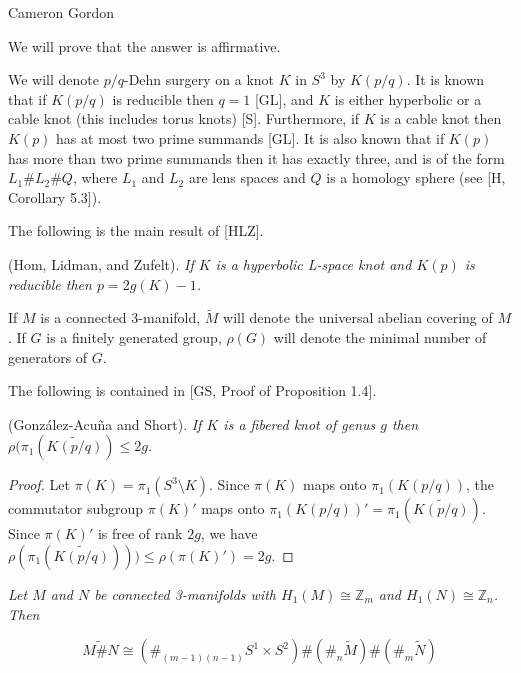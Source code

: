 \documentclass[12pt]{amsart}
\def\zed{{\mathbb Z}}
\begin{document}
\begin{center}
{\large Cameron Gordon}
\end{center}
We will prove that the answer is affirmative.
\medskip

We will denote $p/q$-Dehn surgery on a knot $K$ in $S^3$ by $K(p/q)$. It is known that if $K(p/q)$ is reducible then $q = 1$ [GL], and $K$ is either hyperbolic or a cable knot (this includes torus knots) [S]. Furthermore, if $K$ is a cable knot then $K(p)$ has at most two prime summands [GL]. It is also known that if $K(p)$ has more than two prime summands then it has exactly three, and is of the form $L_1 \# L_2 \# Q$, where $L_1$ and $L_2$ are lens spaces and $Q$ is a homology sphere (see [H, Corollary 5.3]).
\medskip

The following is the main result of [HLZ].
\medskip

 (Hom, Lidman, and Zufelt).
{\it If $K$ is a hyperbolic L-space knot and $K(p)$ is reducible then $p = 2g(K) - 1$.}
\medskip

If $M$ is a connected 3-manifold, $\tilde M$ will denote the universal abelian covering of $M$. If $G$ is a finitely generated group, $\rho (G)$ will denote the minimal number of generators of $G$.

The following is contained in [GS, Proof of Proposition 1.4].
\medskip

 (Gonz\'alez-Acu\~na and Short). {\it If $K$ is a fibered knot of genus $g$ then $\rho (\pi_1(\widetilde{K(p/q)}) \le 2g$.}

\begin{proof}

  Let $\pi(K) = \pi_1(S^3 \setminus K)$. Since $\pi(K)$ maps onto $\pi_1(K(p/q))$, the commutator subgroup $\pi(K)'$ maps onto $\pi_1(K(p/q))' = \pi_1(\widetilde{K(p/q)})$. Since $\pi(K)'$ is free of rank $2g$, we have $\rho(\pi_1(\widetilde{K(p/q)}))) \le \rho(\pi(K)') = 2g$.
\end{proof}

\medskip

{\it Let $M$ and $N$ be connected 3-manifolds with $H_1(M) \cong \zed_m$ and $H_1(N) \cong \zed_n$. Then

$$\widetilde{M\#N} \cong (\#_{(m-1)(n-1)} S^1 \times S^2) \# (\#_{n} \tilde {M}) \# (\#_{m} \tilde{N})$$}
\end{document}
